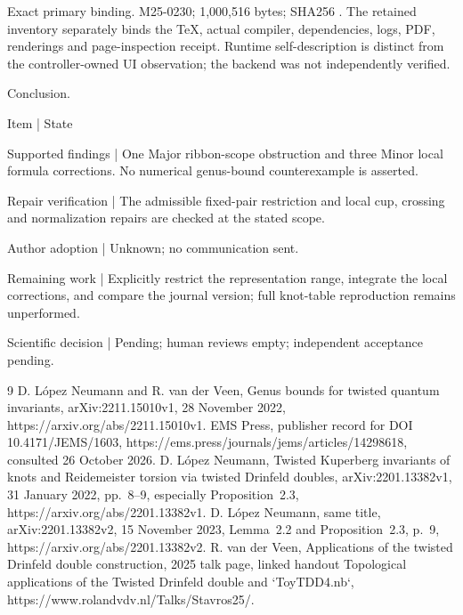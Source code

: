 \documentclass[10pt]{article}
\begin{document}
Exact primary binding. M25-0230; 1,000,516 bytes; SHA256 . The retained inventory separately binds the TeX, actual compiler, dependencies, logs, PDF, renderings and page-inspection receipt. Runtime self-description is distinct from the controller-owned UI observation; the backend was not independently verified.\par
Conclusion.\par
Item | State\par
Supported findings | One Major ribbon-scope obstruction and three Minor local formula corrections. No numerical genus-bound counterexample is asserted.\par
Repair verification | The admissible fixed-pair restriction and local cup, crossing and normalization repairs are checked at the stated scope.\par
Author adoption | Unknown; no communication sent.\par
Remaining work | Explicitly restrict the representation range, integrate the local corrections, and compare the journal version; full knot-table reproduction remains unperformed.\par
Scientific decision | Pending; human reviews empty; independent acceptance pending.\par
9 D. López Neumann and R. van der Veen, Genus bounds for twisted quantum invariants, arXiv:2211.15010v1, 28 November 2022, https://arxiv.org/abs/2211.15010v1. EMS Press, publisher record for DOI 10.4171/JEMS/1603, https://ems.press/journals/jems/articles/14298618, consulted 26 October 2026. D. López Neumann, Twisted Kuperberg invariants of knots and Reidemeister torsion via twisted Drinfeld doubles, arXiv:2201.13382v1, 31 January 2022, pp. 8–9, especially Proposition 2.3, https://arxiv.org/abs/2201.13382v1. D. López Neumann, same title, arXiv:2201.13382v2, 15 November 2023, Lemma 2.2 and Proposition 2.3, p. 9, https://arxiv.org/abs/2201.13382v2. R. van der Veen, Applications of the twisted Drinfeld double construction, 2025 talk page, linked handout Topological applications of the Twisted Drinfeld double and `ToyTDD4.nb`, https://www.rolandvdv.nl/Talks/Stavros25/.\par
\end{document}
